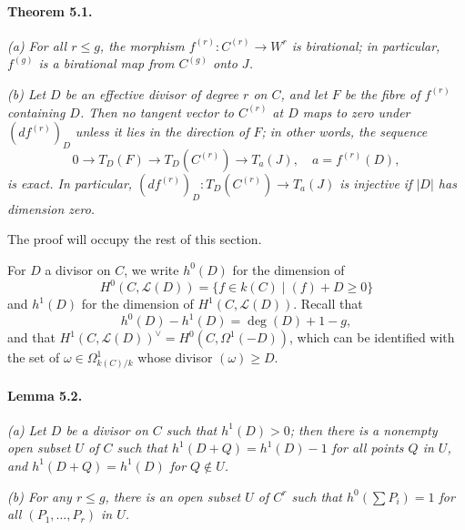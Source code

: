 \paragraph{Theorem 5.1.}
\textit{(a) For all $r \le g$, the morphism $f^{(r)} \colon C^{(r)} \to W^r$
is birational; in particular, $f^{(g)}$ is a birational map from $C^{(g)}$
onto $J$.}

\textit{(b) Let $D$ be an effective divisor of degree $r$ on $C$, and let $F$
be the fibre of $f^{(r)}$ containing $D$. Then no tangent vector to $C^{(r)}$
at $D$ maps to zero under $(df^{(r)})_D$ unless it lies in the direction of
$F$; in other words, the sequence}
\[
  0 \to T_D(F) \to T_D(C^{(r)}) \to T_a(J), \quad a = f^{(r)}(D),
\]
\textit{is exact. In particular,
$(df^{(r)})_D \colon T_D(C^{(r)}) \to T_a(J)$ is injective if $|D|$ has
dimension zero.}

The proof will occupy the rest of this section.

For $D$ a divisor on $C$, we write $h^0(D)$ for the dimension of
\[
  H^0(C, \mathcal{L}(D)) = \{ f \in k(C) \mid (f) + D \ge 0 \}
\]
and $h^1(D)$ for the dimension of $H^1(C, \mathcal{L}(D))$. Recall that
\[
  h^0(D) - h^1(D) = \deg(D) + 1 - g,
\]
and that $H^1(C, \mathcal{L}(D))^{\vee} = H^0(C, \Omega^1(-D))$, which can be
identified with the set of $\omega \in \Omega^1_{k(C)/k}$ whose divisor
$(\omega) \ge D$.

\paragraph{Lemma 5.2.}
\textit{(a) Let $D$ be a divisor on $C$ such that $h^1(D) > 0$; then there is
a nonempty open subset $U$ of $C$ such that $h^1(D + Q) = h^1(D) - 1$ for all
points $Q$ in $U$, and $h^1(D + Q) = h^1(D)$ for $Q \notin U$.}

\textit{(b) For any $r \le g$, there is an open subset $U$ of $C^r$ such that
$h^0(\sum P_i) = 1$ for all $(P_1, \dots, P_r)$ in $U$.}


